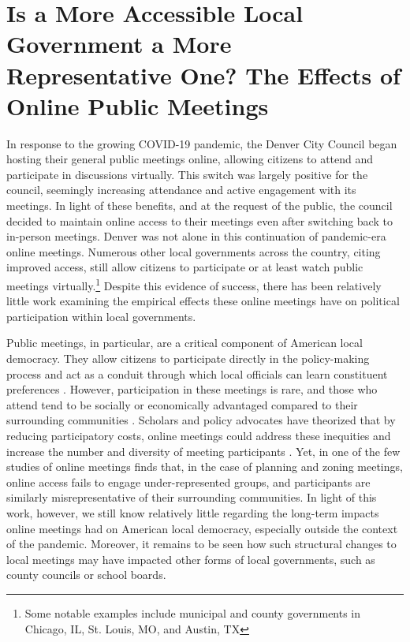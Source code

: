 \chapter{Is a More Accessible Local Government a More Representative One? The Effects of Online Public Meetings}
\label{chap:dissertation-parts}
    
    
    In response to the growing COVID-19 pandemic, the Denver City Council began hosting their general public meetings online, allowing citizens to attend and participate in discussions virtually. This switch was largely positive for the council, seemingly increasing attendance and active engagement with its meetings. In light of these benefits, and at the request of the public, the council decided to maintain online access to their meetings even after switching back to in-person meetings. Denver was not alone in this continuation of pandemic-era online meetings. Numerous other local governments across the country, citing improved access, still allow citizens to participate or at least watch public meetings virtually.\footnote{Some notable examples include municipal and county governments in Chicago, IL, St. Louis, MO, and Austin, TX} Despite this evidence of success, there has been relatively little work examining the empirical effects these online meetings have on political participation within local governments.

    Public meetings, in particular, are a critical component of American local democracy. They allow citizens to participate directly in the policy-making process \citep{adamsPublicMeetingsDemocratic2004} and act as a conduit through which local officials can learn constituent preferences \citep{einsteinMayorsPartisanshipRedistribution2018,choExperimentingPublicEngagement2021,fungVarietiesParticipationComplex2006}. However, participation in these meetings is rare, and those who attend tend to be socially or economically advantaged compared to their surrounding communities \citep{einsteinWhoParticipatesLocal2019,yoderDoesPropertyOwnership2020}. Scholars and policy advocates have theorized that by reducing participatory costs, online meetings could address these inequities and increase the number and diversity of meeting participants \citep{icmaReflectingVirtualPublic2020}. Yet, in one of the few studies of online meetings \citet{einsteinStillMutedLimited2022} finds that, in the case of planning and zoning meetings, online access fails to engage under-represented groups, and participants are similarly misrepresentative of their surrounding communities. In light of this work, however, we still know relatively little regarding the long-term impacts online meetings had on American local democracy, especially outside the context of the pandemic. Moreover, it remains to be seen how such structural changes to local meetings may have impacted other forms of local governments, such as county councils or school boards.

